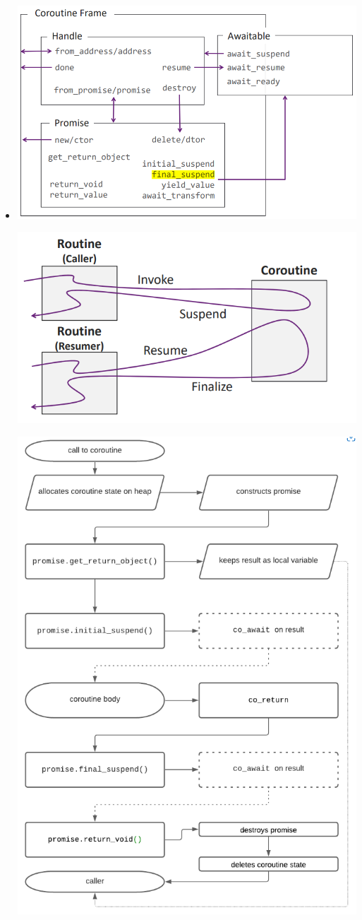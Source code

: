 \documentclass[a4paper,11pt,twoside]{book}
\begin{document}
\begin{itemize}
	\item 
	\includegraphics[width=.9\linewidth]{pics/cor1.png}
	
	\includegraphics[width=.9\linewidth]{pics/cor2.png}
	
		\includegraphics[width=.9\linewidth]{pics/cor3.png}
		

\end{itemize}
\end{document}
